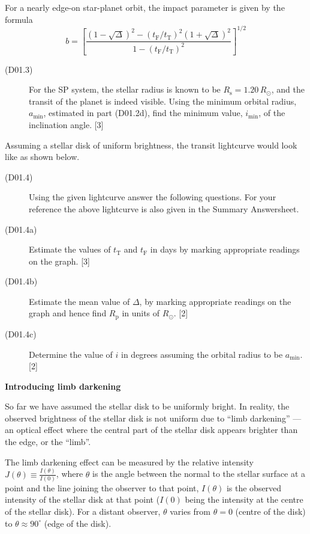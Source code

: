For a nearly edge-on star-planet orbit, the impact parameter is given by the
formula
\[
b = \left[\frac{(1-\sqrt{\Delta})^2
      - (t_{\mathrm{F}}/t_{\mathrm{T}})^2(1+\sqrt{\Delta})^2}
     {1 - (t_{\mathrm{F}}/t_{\mathrm{T}})^2}\right]^{1/2}
\]

\begin{description}
\item[(D01.3)] For the SP system, the stellar radius is known to be
  $R_{\mathrm{s}} = 1.20\,R_\odot$, and the transit of the planet is indeed
  visible. Using the minimum orbital radius, $a_{\mathrm{min}}$, estimated in
  part (D01.2d), find the minimum value, $i_{\mathrm{min}}$, of the
  inclination angle. \hfill[3]
\end{description}

Assuming a stellar disk of uniform brightness, the transit lightcurve would
look like as shown below.


\begin{description}
\item[(D01.4)] Using the given lightcurve answer the following questions. For
  your reference the above lightcurve is also given in the Summary
  Answersheet.
\item[(D01.4a)] Estimate the values of $t_{\mathrm{T}}$ and $t_{\mathrm{F}}$
  in days by marking appropriate readings on the graph. \hfill[3]
\item[(D01.4b)] Estimate the mean value of $\Delta$, by marking appropriate
  readings on the graph and hence find $R_{\mathrm{p}}$ in units of
  $R_\odot$. \hfill[2]
\item[(D01.4c)] Determine the value of $i$ in degrees assuming the orbital
  radius to be $a_{\mathrm{min}}$. \hfill[2]
\end{description}

\medskip\noindent\textbf{Introducing limb darkening}

So far we have assumed the stellar disk to be uniformly bright. In reality,
the observed brightness of the stellar disk is not uniform due to ``limb
darkening'' --- an optical effect where the central part of the stellar disk
appears brighter than the edge, or the ``limb''.

The limb darkening effect can be measured by the relative intensity
$J(\theta) \equiv \frac{I(\theta)}{I(0)}$, where $\theta$ is the angle between
the normal to the stellar surface at a point and the line joining the observer
to that point, $I(\theta)$ is the observed intensity of the stellar disk at
that point ($I(0)$ being the intensity at the centre of the stellar disk). For
a distant observer, $\theta$ varies from $\theta = 0$ (centre of the disk) to
$\theta \approx 90^\circ$ (edge of the disk).

